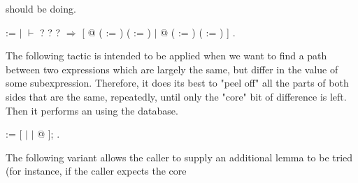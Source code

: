 \documentclass[12pt]{report}
\begin{document}
   should be doing. \begin{coqdoccode}
\coqdocemptyline
\coqdocnoindent
{}  :=\coqdoceol
\coqdocindent{1.00em}
  \coqdoceol
\coqdocindent{2.00em}
\ensuremath{|} \ensuremath{\vdash} ? ?   ? \ensuremath{\Rightarrow}\coqdoceol
\coqdocindent{3.00em}
 [\coqdoceol
\coqdocindent{5.00em}
 @  ( := ) ( := )\coqdoceol
\coqdocindent{4.00em}
\ensuremath{|}  @  ( := ) ( := )\coqdoceol
\coqdocindent{3.00em}
]\coqdoceol
\coqdocindent{1.00em}
.\coqdoceol
\coqdocemptyline
\end{coqdoccode}
The following tactic is intended to be applied when we want to
   find a path between two expressions which are largely the same, but
   differ in the value of some subexpression.  Therefore, it does its
   best to "peel off" all the parts of both sides that are the same,
   repeatedly, until only the "core" bit of difference is left.  Then
   it performs an  using the  database. \begin{coqdoccode}
\coqdocemptyline
\coqdocnoindent
{}  :=\coqdoceol
\coqdocindent{1.00em}
   [\coqdoceol
\coqdocindent{3.00em}
 \coqdoceol
\coqdocindent{2.00em}
\ensuremath{|}  \coqdoceol
\coqdocindent{2.00em}
\ensuremath{|}  @\coqdoceol
\coqdocindent{2.00em}
];   .\coqdoceol
\coqdocemptyline
\end{coqdoccode}
The following variant allows the caller to supply an additional
   lemma to be tried (for instance, if the caller expects the core
\end{document}
